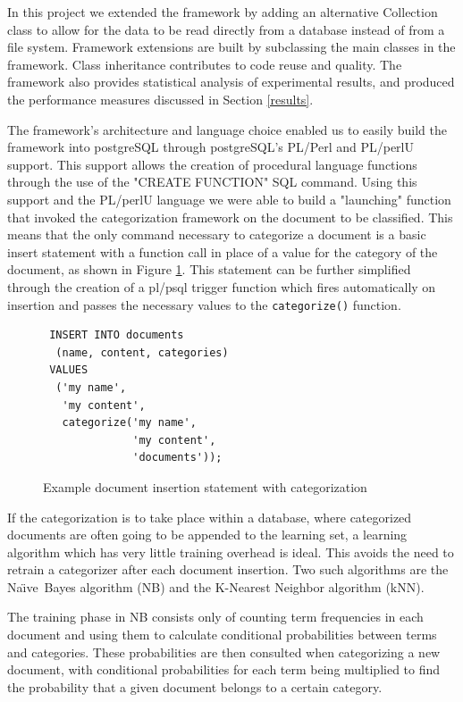 \documentclass[twocolumn]{article}
\newcommand{\naive}{Na\"\i ve}
\newcommand{\method}[1]{\texttt{#1()}}
\begin{document}
In this project we extended the framework by adding an alternative
Collection class to allow for the data to be read directly from a
database instead of from a file system.  Framework extensions are built by subclassing
the main classes in the framework. Class inheritance contributes to code reuse and 
quality. The framework also provides statistical analysis of experimental results, and 
produced the performance measures discussed in Section \ref{results}.

The framework's architecture and language choice enabled us to easily build the 
framework into postgreSQL through postgreSQL's PL/Perl and PL/perlU support. 
This support allows the creation of procedural language functions through the use of 
the "CREATE FUNCTION" SQL command. Using this support and the PL/perlU language 
we were able to build a "launching" function that invoked the categorization 
framework on the document to be classified. This means that the only command 
necessary to categorize a document is a basic insert statement with a function call in 
place of a value for the category of the document, as shown in Figure \ref{sql-insert}.
This statement can be further simplified through the creation of a pl/psql 
trigger function which fires automatically on insertion and passes the necessary values 
to the \method{categorize} function.

\begin{figure}
\begin{verbatim}
 INSERT INTO documents
  (name, content, categories) 
 VALUES
  ('my name',
   'my content',
   categorize('my name',
              'my content',
              'documents'));
\end{verbatim}
\caption{Example document insertion statement with categorization}
\label{sql-insert}
\end{figure}

If the categorization is to take place within a database, where
categorized documents are often going to be appended to the learning
set, a learning algorithm which has very little training overhead is
ideal.  This avoids the need to retrain a categorizer after each
document insertion.  Two such algorithms are the \naive\ Bayes
algorithm (NB) and the K-Nearest Neighbor algorithm (kNN).

The training phase in NB consists only of counting term frequencies in
each document and using them to calculate conditional probabilities
between terms and categories.  These probabilities are then consulted
when categorizing a new document, with conditional probabilities for
each term being multiplied to find the probability that a given
document belongs to a certain category.
\end{document}
